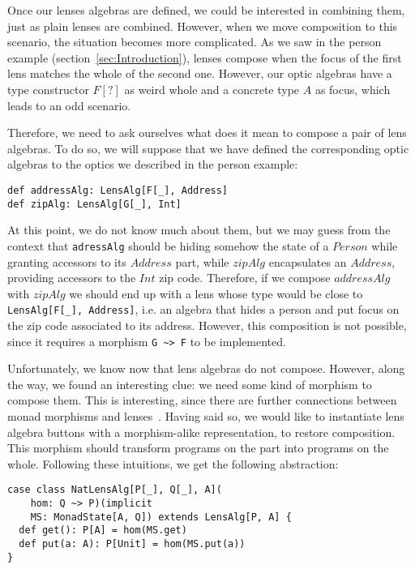 \documentclass[preview, 3p]{elsarticle}
\begin{document}
Once our lenses algebras are defined, we could be interested in combining them,
just as plain lenses are combined. However, when we move composition to this
scenario, the situation becomes more complicated. As we saw in the person
example (section~\ref{sec:Introduction}), lenses compose when the focus of the
first lens matches the whole of the second one. However, our optic algebras have
a type constructor $F[?]$ as weird whole and a concrete type $A$ as focus, which
leads to an odd scenario.

Therefore, we need to ask ourselves what does it mean to compose a pair of lens
algebras. To do so, we will suppose that we have defined the corresponding optic
algebras to the optics we described in the person example:

\begin{lstlisting}
def addressAlg: LensAlg[F[_], Address]
def zipAlg: LensAlg[G[_], Int]
\end{lstlisting}

At this point, we do not know much about them, but we may guess from the context
that \lstinline{adressAlg} should be hiding somehow the state of a $Person$
while granting accessors to its $Address$ part, while $zipAlg$ encapsulates an
$Address$, providing accessors to the $Int$ zip code. Therefore, if we compose
$addressAlg$ with $zipAlg$ we should end up with a lens whose type would be
close to \lstinline{LensAlg[F[_], Address]}, i.e. an algebra that hides a person
and put focus on the zip code associated to its address. However, this
composition is not possible, since it requires a morphism \lstinline{G ~> F} to
be implemented.

Unfortunately, we know now that lens algebras do not compose. However, along the
way, we found an interesting clue: we need some kind of morphism to compose
them. This is interesting, since there are further connections between monad
morphisms and lenses~\cite{abou2015notions}. Having said so, we would like to
instantiate lens algebra buttons with a morphism-alike representation, to
restore composition. This morphism should transform programs on the part into
programs on the whole. Following these intuitions, we get the following
abstraction:

\begin{lstlisting}
case class NatLensAlg[P[_], Q[_], A](
    hom: Q ~> P)(implicit
    MS: MonadState[A, Q]) extends LensAlg[P, A] {
  def get(): P[A] = hom(MS.get)
  def put(a: A): P[Unit] = hom(MS.put(a))
}
\end{lstlisting}
\end{document}

